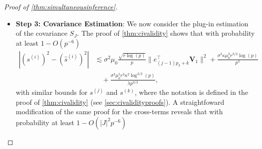 \documentclass[10pt]{article}
\newcommand{\0}{{\mathbf{0}}}
\newcommand{\1}{{\mathbf{1}}}
\newcommand{\Cov}{{\rm Cov}}
\renewcommand{\t}{^{\top}}
\newcommand{\p}{\mathbb{P}}
\newcommand{\inv}{^{-1}}
\renewcommand{\hat}{\widehat}
\renewcommand{\hat}{\widehat}
\begin{document}
\begin{proof}[Proof of \cref{thm:simultaneousinference}]
\begin{itemize}
\begin{align*}
    \sup_{A \in \mathcal{A}} \bigg| \p\bigg\{ S_J^{-1/2} \Cov(\xi_J)^{1/2}Z \in A \bigg\} - \p\bigg\{ Z' \in  A \bigg\} \bigg| &\leq d_{TV} (  S_J^{-1/2} \Cov(\xi_J)^{1/2}Z, Z' ) \\
    &\lesssim \| I - S_J\inv \Cov(\xi_J) \| \\
    &\lesssim |J|^2 \mu_0^2 \frac{r}{p},
\end{align*}
where the final inequality holds by \eqref{Sjapprox}.  Putting it all together, it holds that
\begin{align}
    \sup_{A \in \mathcal{A}} \bigg| &\p\bigg\{ S_J^{-1/2} \mathrm{Vec}(\mathcal{T}_J - \mathcal{\hat T}_J) \in A \bigg\} - \p\bigg\{ Z \in A \bigg\} \bigg| \nonumber \\&\lesssim \frac{|J|^{3/2}}{\sqrt{p\log(p)}} + \frac{|J|^2\mu_0^2 r}{p}  +\frac{ |J|^{3/2}}{s_{\min}}\bigg( \frac{\sigma \kappa^2 \mu_0^3 r^{3/2} \sqrt{\log(p)}}{p^{3/2}} + \frac{\sigma^2 \mu_0^4 \kappa^3 r^2 \log(p)}{\lambda \sqrt{p}} \bigg). \label{tjapprox}
\end{align}
We note that this bound is only non-vacuous if these terms are smaller than one, which requires that
\begin{align}
   s_{\min} &\gg |J|^{3/2} \max\bigg\{ \frac{\sigma \kappa^2 \mu_0^3 r^{3/2} \sqrt{\log(p)}}{p^{3/2}} , \frac{\sigma^2 \mu_0^4 \kappa^3 r^2 \log(p)}{\lambda \sqrt{p}} \bigg\}, \label{smin4}
\end{align}
which is the stronger than the requirements \eqref{smin0},\eqref{smin1}, and \eqref{smin2} by factors of $|J|$. 
\item 
\textbf{Step 3: Covariance Estimation}: We now consider the plug-in estimation of the covariance $S_J$.  The proof of \cref{thm:civalidity} shows that with probability at least $1 - O(p^{-6})$
\begin{align*}
    |(s^{(i)})^2 - (\hat s^{(i)})^2 |  &\lesssim \sigma^2 \mu_0 \frac{\sqrt{r \log(p)}}{p}  \| e_{(j-1)p_3 + k}\t \mathbf{V}_1 \|^2 + \frac{\sigma^2 \kappa \mu_0^2 r^{3/2} \log(p)}{p^3} \\
    &\quad + \frac{\sigma^3 \mu_0^5 r^3 \kappa^2 \log^{3/2}(p)}{\lambda p^{3/2}},
\end{align*}
with similar bounds for $s^{(j)}$ and $s^{(k)}$, where the notation is defined in the proof of \cref{thm:civalidity} (see \cref{sec:civalidityproofs}). %
A straightfoward modification of the same proof for the cross-terms reveals that with probability at least $1 - O(|J|^2 p^{-6})$

\end{itemize}
\end{proof}
\end{document}
